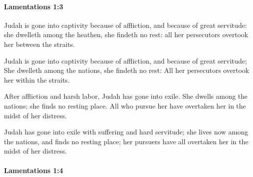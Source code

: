 		\paragraph{Lamentations 1:3} %
			\label{LAMENTATIONS-1-3}

			Judah is gone into captivity because of affliction, and because of great servitude: she dwelleth among the heathen, she findeth no rest: all her persecutors overtook her between the straits.

			\begin{versebox}
					\item[BHS] 
					\item[LXX] 
					\item[ASV] Judah is gone into captivity because of affliction, and because of great servitude; She dwelleth among the nations, she findeth no rest: All her persecutors overtook her within the straits.
					\item[NIV] After affliction and harsh labor, Judah has gone into exile. She dwells among the nations; she finds no resting place. All who pursue her have overtaken her in the midst of her distress.
					\item[NRSV] Judah has gone into exile with suffering and hard servitude; she lives now among the nations, and finds no resting place; her pursuers have all overtaken her in the midst of her distress.
			\end{versebox}

		\paragraph{Lamentations 1:4} %
			\label{LAMENTATIONS-1-4}

